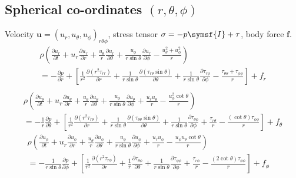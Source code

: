 \documentclass{jknotes}
\begin{document}
\subsection{Spherical co-ordinates $(r,\theta,\phi)$}
Velocity $\symbf{u} = (u_r, u_\theta, u_\phi)_{r\theta\phi}$, stress tensor
$\sigma = -p\symsf{I} + \tau$, body force $\symbf{f}$.
\begingroup
\begin{multline}
	\rho\left( \frac{\partial u_r}{\partial t} + u_r \frac{\partial 
	u_r}{\partial r} + \frac{u_\theta}{r}\frac{\partial u_r}{\partial
	\theta} + \frac{u_\phi}{r\sin\theta}\frac{\partial u_r}{\partial
	\phi} - \frac{u_\theta^2 + u_\phi^2}{r}\right)\\
	= -\frac{\partial p}{\partial r} + \left[ \frac{1}{r^2} \frac{\partial
	(r^2 \tau_{rr})}{\partial r} + \frac{1}{r\sin\theta} \frac{\partial
	(\tau_{r\theta}\sin\theta)}{\partial \theta} + \frac{1}{r\sin\theta}
	\frac{\partial \tau_{r\phi}}{\partial \phi} - \frac{\tau_{\theta\theta} +
	\tau_{\phi\phi}}{r}\right] + f_r\\
\end{multline}
\vspace{-.5in}
\begin{multline}
	\rho\left( \frac{\partial u_\theta}{\partial t} + u_r \frac{\partial 
	u_\theta}{\partial r} + \frac{u_\theta}{r}\frac{\partial u_\theta}{\partial
	\theta} + \frac{u_\phi}{r\sin\theta}\frac{\partial u_\theta}{\partial
	\phi} + \frac{u_r u_\theta}{r} - \frac{u_\phi^2 \cot \theta}{r}\right) \\
	= -\frac{1}{r}\frac{\partial p}{\partial \theta} + \left[ \frac{1}{r^2}
		\frac{\partial (r^2 \tau_{r\theta})}{\partial r} + \frac{1}{r\sin\theta}
		\frac{\partial (\tau_{\theta\theta}\sin\theta)}{\partial \theta} +
		\frac{1}{r\sin\theta} \frac{\partial \tau_{\theta\phi}}{\partial \phi} 
		+ \frac{\tau_{r\theta}}{r} -
	\frac{(\cot\theta)\tau_{\phi\phi}}{r}\right] + f_{\theta}
\end{multline}
\vspace{-.1in}
\begin{multline}
	\rho\left( \frac{\partial u_\phi}{\partial t} + u_r \frac{\partial 
	u_\phi}{\partial r} + \frac{u_\theta}{r}\frac{\partial u_\phi}{\partial
	\theta} + \frac{u_\phi}{r\sin\theta}\frac{\partial u_\phi}{\partial
	\phi} + \frac{u_r u_\phi}{r} - \frac{u_\phi u_\theta \cot \theta}{r}\right) \\
	= -\frac{1}{r\sin\theta}\frac{\partial p}{\partial \phi} + \left[\frac{1}{r^2}
		\frac{\partial (r^2 \tau_{r\phi})}{\partial r} +
		\frac{1}{r}\frac{\partial \tau_{\theta\phi}}{\partial \theta} +
		\frac{1}{r\sin\theta} \frac{\partial \tau_{\phi\phi}}{\partial \phi} 
		+ \frac{\tau_{r\phi}}{r} -
		\frac{(2\cot\theta )\tau_{\phi\phi}}{r}\right] + f_{\phi}
		\phantom{ttt}
\end{multline}
\endgroup
\end{document}
